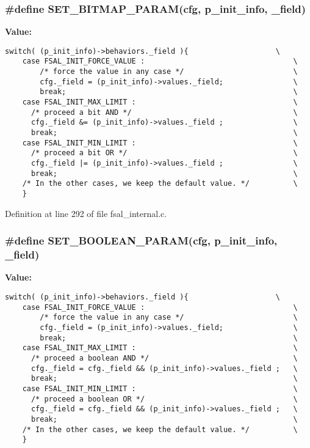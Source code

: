 \subsubsection{\setlength{\rightskip}{0pt plus 5cm}\#define SET\_\-BITMAP\_\-PARAM(cfg, p\_\-init\_\-info, \_\-field)}\label{fsal__internal_8c_a2}


{\bf Value:}

\footnotesize\begin{verbatim}switch( (p_init_info)->behaviors._field ){                    \
    case FSAL_INIT_FORCE_VALUE :                                  \
        /* force the value in any case */                         \
        cfg._field = (p_init_info)->values._field;                \
        break;                                                    \
    case FSAL_INIT_MAX_LIMIT :                                    \
      /* proceed a bit AND */                                     \
      cfg._field &= (p_init_info)->values._field ;                \
      break;                                                      \
    case FSAL_INIT_MIN_LIMIT :                                    \
      /* proceed a bit OR */                                      \
      cfg._field |= (p_init_info)->values._field ;                \
      break;                                                      \
    /* In the other cases, we keep the default value. */          \
    }
\end{verbatim}\normalsize 


Definition at line 292 of file fsal\_\-internal.c.
\subsubsection{\setlength{\rightskip}{0pt plus 5cm}\#define SET\_\-BOOLEAN\_\-PARAM(cfg, p\_\-init\_\-info, \_\-field)}\label{fsal__internal_8c_a3}


{\bf Value:}

\footnotesize\begin{verbatim}switch( (p_init_info)->behaviors._field ){                    \
    case FSAL_INIT_FORCE_VALUE :                                  \
        /* force the value in any case */                         \
        cfg._field = (p_init_info)->values._field;                \
        break;                                                    \
    case FSAL_INIT_MAX_LIMIT :                                    \
      /* proceed a boolean AND */                                 \
      cfg._field = cfg._field && (p_init_info)->values._field ;   \
      break;                                                      \
    case FSAL_INIT_MIN_LIMIT :                                    \
      /* proceed a boolean OR */                                  \
      cfg._field = cfg._field && (p_init_info)->values._field ;   \
      break;                                                      \
    /* In the other cases, we keep the default value. */          \
    }
\end{verbatim}\normalsize 


